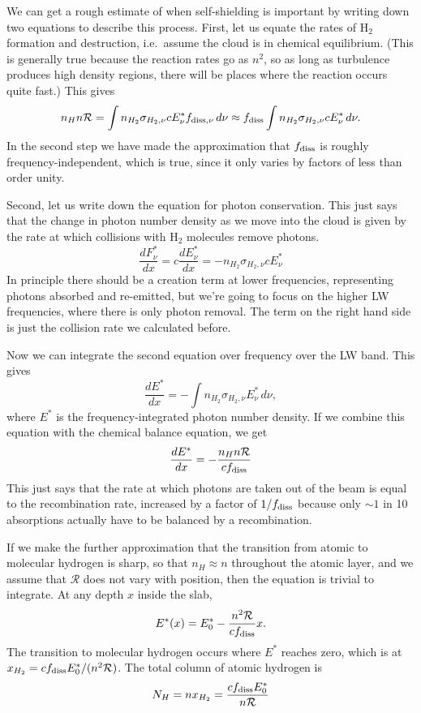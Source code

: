 We can get a rough estimate of when self-shielding is important by writing down two equations to describe this process. First, let us equate the rates of H$_2$ formation and destruction, i.e.\ assume the cloud is in chemical equilibrium. (This is generally true because the reaction rates go as $n^2$, so as long as turbulence produces high density regions, there will be places where the reaction occurs quite fast.) This gives
\begin{equation}
n_H n \mathcal{R} = \int n_{H_2} \sigma_{H_2,\nu} c E^*_{\nu} f_{\rm diss,\nu}\, d\nu
\approx f_{\rm diss}  \int n_{H_2} \sigma_{H_2,\nu} c E^*_{\nu}\, d\nu.
\end{equation}
In the second step we have made the approximation that $f_{\rm diss}$ is roughly frequency-independent, which is true, since it only varies by factors of less than order unity.

Second, let us write down the equation for photon conservation. This just says that the change in photon number density as we move into the cloud is given by the rate at which collisions with H$_2$ molecules remove photons.
\begin{equation}
\frac{dF^*_{\nu}}{dx}= c \frac{dE^*_{\nu}}{dx} = -n_{H_2} \sigma_{H_2,\nu} c E^*_{\nu}
\end{equation}
In principle there should be a creation term at lower frequencies, representing photons absorbed and re-emitted, but we're going to focus on the higher LW frequencies, where there is only photon removal. The term on the right hand side is just the collision rate we calculated before.

Now we can integrate the second equation over frequency over the LW band. This gives
\begin{equation}
\frac{dE^*}{dx} = -\int n_{H_2} \sigma_{H_2,\nu} E^*_{\nu}\, d\nu,
\end{equation}
where $E^*$ is the frequency-integrated photon number density. If we combine this equation with the chemical balance equation, we get
\begin{equation}
\frac{dE^*}{dx} = -\frac{n_H n \mathcal{R}}{c f_{\rm diss}}
\end{equation}
This just says that the rate at which photons are taken out of the beam is equal to the recombination rate, increased by a factor of $1/f_{\rm diss}$ because only $\sim 1$ in 10 absorptions actually have to be balanced by a recombination.

If we make the further approximation that the transition from atomic to molecular hydrogen is sharp, so that $n_H\approx n$ throughout the atomic layer, and we assume that $\mathcal{R}$ does not vary with position, then the equation is trivial to integrate. At any depth $x$ inside the slab,
\begin{equation}
E^*(x) = E^*_0 - \frac{n^2\mathcal{R}}{c f_{\rm diss}} x.
\end{equation}
The transition to molecular hydrogen occurs where $E^*$ reaches zero, which is at $x_{H_2}= c f_{\rm diss} E^*_0 / (n^2 \mathcal{R})$. The total column of atomic hydrogen is
\begin{equation}
N_H = nx_{H_2} = \frac{c f_{\rm diss} E^*_0}{n\mathcal{R}}
\end{equation}

